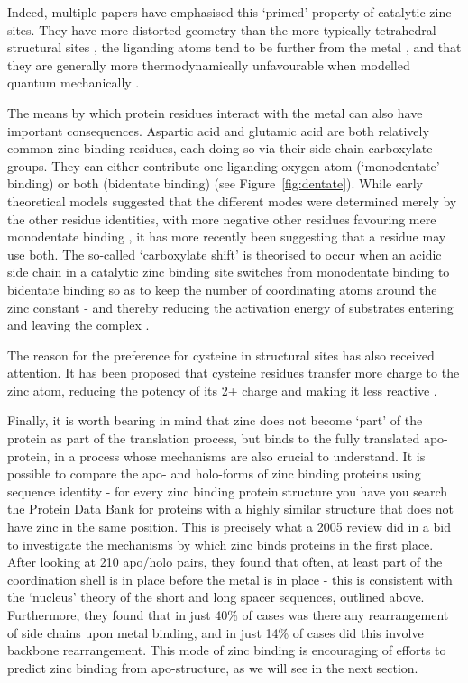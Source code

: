 Indeed, multiple papers have emphasised this `primed' property of catalytic zinc sites. They have more distorted geometry than the more typically tetrahedral structural sites \cite{roe1999zinc}, the liganding atoms tend to be further from the metal \cite{lee2008physical}, and that they are generally more thermodynamically unfavourable when modelled quantum mechanically \cite{sousa2009zinc}.

The means by which protein residues interact with the metal can also have important consequences. Aspartic acid and glutamic acid are both relatively common zinc binding residues, each doing so via their side chain carboxylate groups. They can either contribute one liganding oxygen atom (`monodentate' binding) or both (bidentate binding) (see
Figure~\ref{fig:dentate}). While early theoretical models suggested that the different modes were determined merely by the other residue identities, with more negative other residues favouring mere monodentate binding \cite{ryde1999carboxylate}, it has more recently been suggesting that a residue may use both. The so-called `carboxylate shift' is theorised to occur when an acidic side chain in a catalytic zinc binding site switches from monodentate binding to bidentate binding so as to keep the number of coordinating atoms around the zinc constant - and thereby reducing the activation energy of substrates entering and leaving the complex \cite{sousa2007carboxylate}.


The reason for the preference for cysteine in structural sites has also received attention. It has been proposed that cysteine residues transfer more charge to the zinc atom, reducing the potency of its 2+ charge and making it less reactive \cite{lee2008physical}. 

Finally, it is worth bearing in mind that zinc does not become `part' of the protein as part of the translation process, but binds to the fully translated apo-protein, in a process whose mechanisms are also crucial to understand. It is possible to compare the apo- and holo-forms of zinc binding proteins using sequence identity - for every zinc binding protein structure you have you search the Protein Data Bank for proteins with a highly similar structure that does not have zinc in the same position. This is precisely what a 2005 review did \cite{babor2005flexibility} in a bid to investigate the mechanisms by which zinc binds proteins in the first place. After looking at 210 apo/holo pairs, they found that often, at least part of the coordination shell is in place before the metal is in place - this is consistent with the `nucleus' theory of the short and long spacer sequences, outlined above. Furthermore, they found that in just 40\% of cases was there any rearrangement of side chains upon metal binding, and in just 14\% of cases did this involve backbone rearrangement. This mode of zinc binding is encouraging of efforts to predict zinc binding from apo-structure, as we will see in the next section.

